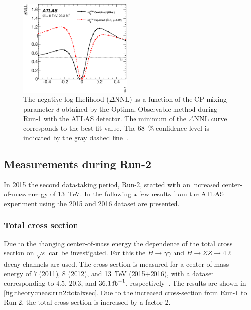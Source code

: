 \begin{figure}[htbp]
    \centering
    \includegraphics[width=0.5\textwidth]{./figures/theory/cpeven_dtilde.eps}
    \caption{The negative log likelihood ($\Delta \text{NNL}$) as a function of the CP-mixing parameter $\tilde{d}$
             obtained by the Optimal Observable method during Run-1 with the ATLAS detector.
             The minimum of the $\Delta \text{NNL}$ curve corresponds to the best fit value.
             The \SI{68}{\percent} confidence level is indicated by the gray dashed line~\cite{HiggsCPTauTau}.}\label{fig:theory:meas:run1:oo}
\end{figure}

\FloatBarrier{}

\subsection{Measurements during Run-2}\label{sub:theory:meas:run2}

In 2015 the second data-taking period, Run-2, started with an increased center-of-mass energy of \SI{13}{\TeV}.
In the following a few results from the ATLAS experiment using the 2015 and 2016 dataset are presented.

\subsubsection{Total cross section}\label{subsub:theory:meas:run2:totalxsec}

Due to the changing center-of-mass energy the dependence of the total cross section on $\sqrt{s}$ can be investigated.
For this the $H\to\gamma\gamma$ and $H \to ZZ \to 4\ell$ decay channels are used.
The cross section is measured for a center-of-mass energy of $7$ (2011), $8$ (2012), and \SI{13}{\TeV} (2015+2016),
with a dataset corresponding to $4.5$, $20.3$, and $\SI{36.1}{\invfb}$, respectively~\cite{ATLAS-CONF-2017-047}.
The results are shown in \cref{fig:theory:meas:run2:totalxsec}.
Due to the increased cross-section from Run-1 to Run-2, the total cross section is increased by a factor 2.


